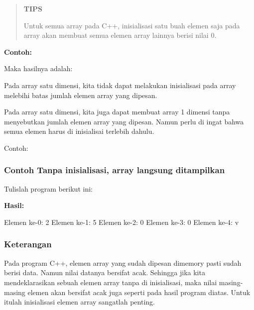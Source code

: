 \begin{quotation}
{\LARGE {}} \textbf{TIPS}

Untuk
semua array pada C++, inisialisasi satu buah elemen saja pada array akan
membuat semua elemen array lainnya berisi nilai 0.
\end{quotation}


\textbf{Contoh:}



Maka hasilnya adalah:



Pada array satu dimensi, kita tidak dapat melakukan inisialisasi pada
array melebihi batas jumlah elemen array yang dipesan.

Pada array satu dimensi, kita juga dapat membuat array 1 dimensi tanpa
menyebutkan jumlah elemen array yang dipesan. Namun perlu di ingat bahwa
semua elemen harus di inisialisai terlebih dahulu.

Contoh:



\subsubsection*{Contoh Tanpa inisialisasi, array langsung ditampilkan}

Tulislah program berikut ini:



\textbf{Hasil:}

\begin{lcverbatim}
Elemen ke-0: 2
Elemen ke-1: 5
Elemen ke-2: 0
Elemen ke-3: 0
Elemen ke-4: v
\end{lcverbatim}

\subsubsection*{Keterangan}

Pada program C++, elemen array yang sudah dipesan dimemory pasti sudah
berisi data. Namun nilai datanya bersifat acak. Sehingga jika kita
mendeklarasikan sebuah elemen array tanpa di inisialisasi, maka nilai
masing-masing elemen akan bersifat acak juga seperti pada hasil program
diatas. Untuk itulah inisialisasi elemen array sangatlah penting.

